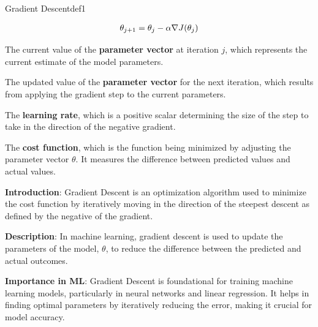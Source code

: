 \documentclass[
  12 pt,
  a4paper,
]{book}
\numberwithin{equation}{section}
\theoremstyle{plain}      %
\theoremstyle{definition} %
\theoremstyle{remark}     %
\theoremstyle{note}         %
\begin{document}
\newpage

\vspace*{\fill}

\begin{a_def_eq}{Gradient Descent}{def1} 

\begin{align}
\large{\theta_{j+1} = \theta_j - \alpha \nabla J(\theta_j)}
\end{align}

\begin{description}[align=left, labelwidth=2cm, labelsep=0em, leftmargin=2cm]
    \item[$\theta_j$] The current value of the \textbf{parameter vector} at iteration $j$, which represents the current estimate of the model parameters.
    \vspace{0.5\baselineskip}
    \item[$\theta_{j+1}$] The updated value of the \textbf{parameter vector} for the next iteration, which results from applying the gradient step to the current parameters.
    \vspace{0.5\baselineskip}
    \item[$\alpha$] The \textbf{learning rate}, which is a positive scalar determining the size of the step to take in the direction of the negative gradient.
    \vspace{0.5\baselineskip}
    \item[$J$] The \textbf{cost function}, which is the function being minimized by adjusting the parameter vector $\theta$. It measures the difference between predicted values and actual values.
\end{description}

\end{a_def_eq}

\hfill\break

\textbf{Introduction}: Gradient Descent is an optimization algorithm
used to minimize the cost function by iteratively moving in the
direction of the steepest descent as defined by the negative of the
gradient.

\textbf{Description}: In machine learning, gradient descent is used to
update the parameters of the model, \(\theta\), to reduce the difference
between the predicted and actual outcomes.

\textbf{Importance in ML}: Gradient Descent is foundational for training
machine learning models, particularly in neural networks and linear
regression. It helps in finding optimal parameters by iteratively
reducing the error, making it crucial for model accuracy.\\
\end{document}
